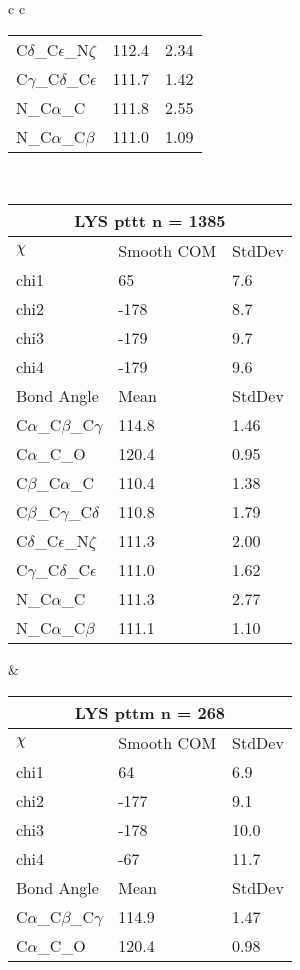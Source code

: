 \begin{longtable}{ c c }
\begin{tabular}{ l l l }
  C$\delta$\_C$\epsilon$\_N$\zeta$ & 112.4 & 2.34\\
  C$\gamma$\_C$\delta$\_C$\epsilon$ & 111.7 & 1.42\\
  N\_C$\alpha$\_C & 111.8 & 2.55\\
  N\_C$\alpha$\_C$\beta$ & 111.0 & 1.09\\
  \bottomrule
  \end{tabular}
  \\
  \begin{tabular}{ l l l }
  \toprule
  \multicolumn{3}{c}{LYS \textbf{pttt} n = 1385} \\ \toprule
  $\chi$       & Smooth COM & StdDev \\ \midrule
  chi1 & 65 & 7.6 \\ 
  chi2 & -178 & 8.7 \\ 
  chi3 & -179 & 9.7 \\ 
  chi4 & -179 & 9.6 \\ \midrule
  Bond Angle   & Mean     & StdDev \\ \midrule
  C$\alpha$\_C$\beta$\_C$\gamma$ & 114.8 & 1.46\\
  C$\alpha$\_C\_O & 120.4 & 0.95\\
  C$\beta$\_C$\alpha$\_C & 110.4 & 1.38\\
  C$\beta$\_C$\gamma$\_C$\delta$ & 110.8 & 1.79\\
  C$\delta$\_C$\epsilon$\_N$\zeta$ & 111.3 & 2.00\\
  C$\gamma$\_C$\delta$\_C$\epsilon$ & 111.0 & 1.62\\
  N\_C$\alpha$\_C & 111.3 & 2.77\\
  N\_C$\alpha$\_C$\beta$ & 111.1 & 1.10\\
  \bottomrule
  \end{tabular}
  &
  \begin{tabular}{ l l l }
  \toprule
  \multicolumn{3}{c}{LYS \textbf{pttm} n = 268} \\ \toprule
  $\chi$       & Smooth COM & StdDev \\ \midrule
  chi1 & 64 & 6.9 \\ 
  chi2 & -177 & 9.1 \\ 
  chi3 & -178 & 10.0 \\ 
  chi4 & -67 & 11.7 \\ \midrule
  Bond Angle   & Mean     & StdDev \\ \midrule
  C$\alpha$\_C$\beta$\_C$\gamma$ & 114.9 & 1.47\\
  C$\alpha$\_C\_O & 120.4 & 0.98\\

\end{tabular}
\end{longtable}
